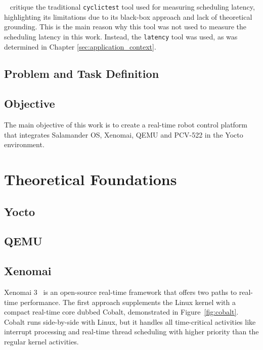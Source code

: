 \documentclass[MMR,Master,english]{twbook}
\begin{document}
\bigskip \noindent \citeauthor{deoliveiraDemystifyingRealTimeLinux}~\cite{deoliveiraDemystifyingRealTimeLinux} critique the traditional \texttt{cyclictest} tool used for measuring scheduling latency, highlighting its limitations due to its black-box approach and lack of theoretical grounding. This is the main reason why this tool was not used to measure the scheduling latency in this work. Instead, the \texttt{latency} tool was used, as was determined in Chapter \ref{sec:application_context}.




\clearpage
\section{Problem and Task Definition}


\clearpage
\section{Objective}

The main objective of this work is to create a real-time robot control platform that integrates Salamander OS, Xenomai, QEMU and PCV-522 in the Yocto environment.


\clearpage


\chapter{Theoretical Foundations}
\section{Yocto}\label{sec:yocto}

\section{QEMU}\label{sec:qemu}

\section{Xenomai}\label{sec:xenomai}
\noindent Xenomai 3~\cite{XenomaiXenomai} is an open-source real-time framework that offers two paths to real-time performance. The first approach supplements the Linux kernel with a compact real-time core dubbed Cobalt, demonstrated in Figure~\ref{fig:cobalt}. Cobalt runs side-by-side with Linux, but it handles all time-critical activities like interrupt processing and real-time thread scheduling with higher priority than the regular kernel activities.
\end{document}
